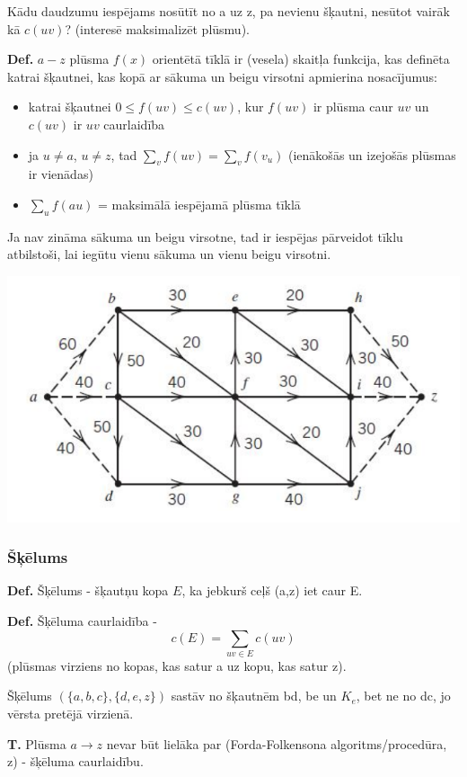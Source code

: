 \documentclass{article}
\begin{document}
Kādu daudzumu iespējams nosūtīt no a uz z, pa nevienu šķautni, nesūtot vairāk kā $c(uv)$? (interesē maksimalizēt plūsmu).

\textbf{Def.} $a-z$ plūsma $f(x)$ orientētā tīklā ir (vesela) skaitļa funkcija, kas definēta katrai šķautnei, kas kopā ar sākuma un beigu virsotni apmierina nosacījumus:
\begin{itemize}
	\item katrai šķautnei $0 \le f(uv) \le c(uv) $, kur $f(uv)$ ir plūsma caur $uv$ un $c(uv)$ ir $uv$ caurlaidība
	\item ja $u \ne a$, $u \ne z$, tad $\sum_{v}{f(uv)} = \sum_{v}{f(v_u)}$ (ienākošās un izejošās plūsmas ir vienādas)
	\item $\sum_{u}{f(au)}$ = maksimālā iespējamā plūsma tīklā
\end{itemize}

Ja nav zināma sākuma un beigu virsotne, tad ir iespējas pārveidot tīklu atbilstoši, lai iegūtu vienu sākuma un vienu beigu virsotni.

\begin{center}
\includegraphics[width=0.5\linewidth]{network_extension-1}
\end{center}

\subsubsection{Šķēlums}

\textbf{Def.}  Šķēlums - šķautņu kopa $E$, ka jebkurš ceļš (a,z) iet caur E.

\textbf{Def.} Šķēluma caurlaidība - \begin{equation}c(E ) = \sum_{uv \in E}{c(uv)}\end{equation} (plūsmas virziens no kopas, kas satur a uz kopu, kas satur z).

Šķēlums $(\{a, b, c\}, \{d, e, z\})$ sastāv no šķautnēm bd, be un $K_e$, bet ne no dc, jo vērsta pretējā virzienā.

\textbf{T. } Plūsma $a \to z$ nevar būt lielāka par (Forda-Folkensona algoritms/procedūra, z) - šķēluma caurlaidību.
\end{document}
